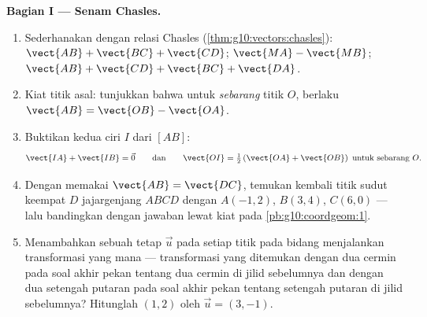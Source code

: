 \begin{problem}
\medskip
\noindent\textbf{Bagian I --- Senam Chasles.}
\begin{enumerate}
  \item Sederhanakan dengan relasi Chasles
        (\cref{thm:g10:vectors:chasles}):
        $\vect{AB} + \vect{BC} + \vect{CD}$; \quad
        $\vect{MA} - \vect{MB}$; \quad
        $\vect{AB} + \vect{CD} + \vect{BC} + \vect{DA}$.
  \item Kiat titik asal: tunjukkan bahwa untuk \emph{sebarang} titik $O$,
        berlaku $\vect{AB} = \vect{OB} - \vect{OA}$.
  \item Buktikan kedua ciri  $I$ dari
        $[AB]$:
        \[
        \vect{IA} + \vect{IB} = \vec 0
        \qquad\text{dan}\qquad
        \vect{OI} = \tfrac12\left(\vect{OA} + \vect{OB}\right)
        \ \text{untuk sebarang } O .
        \]
  \item Dengan memakai $\vect{AB} = \vect{DC}$, temukan kembali titik sudut
        keempat $D$ jajargenjang $ABCD$ dengan $A(-1, 2)$,
        $B(3, 4)$, $C(6, 0)$ --- lalu bandingkan dengan
        jawaban lewat kiat  pada \cref{pb:g10:coordgeom:1}.
  \item Menambahkan sebuah  tetap $\vec u$ pada setiap titik pada
        bidang menjalankan transformasi yang mana --- transformasi
        yang ditemukan dengan dua cermin pada soal akhir pekan tentang dua
        cermin di jilid sebelumnya dan dengan dua setengah putaran pada soal
        akhir pekan tentang setengah putaran di jilid sebelumnya? Hitunglah
         $(1, 2)$ oleh $\vec u = (3, -1)$.
\end{enumerate}


\end{problem}
